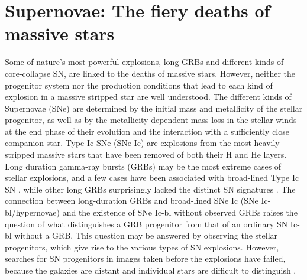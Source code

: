 \section{Supernovae: The fiery deaths of massive stars}
\label{sec:intro:sn}

Some of nature's most powerful explosions, long
  GRBs and different kinds of core-collapse SN, are linked to the
  deaths of massive stars. However, neither the progenitor system nor
  the production conditions that lead to each kind of explosion in a
  massive stripped star are well understood. The different kinds of
  Supernovae (SNe) are determined by the initial mass and metallicity
  of the stellar progenitor, as well as by the metallicity-dependent
  mass loss in the stellar winds at the end phase of their evolution
  and the interaction with a sufficiently close companion star. Type
  Ic SNe (SNe Ic) are explosions from the most heavily stripped
  massive stars that have been removed of both their H and He
  layers. Long duration gamma-ray bursts (GRBs) may be the most
  extreme cases of stellar explosions, and a few cases have been
  associated with broad-lined Type Ic SN \citep{Woosley2006}, while other long GRBs
  surprisingly lacked the distinct SN signatures \citep{Fynbo2006}. The connection
  between long-duration GRBs and broad-lined SNe Ic (SNe
  Ic-bl/hypernovae) and the existence of SNe Ic-bl without observed
  GRBs raises the question of what distinguishes a GRB progenitor from
  that of an ordinary SN Ic-bl without a GRB. This question may be
  answered by observing the stellar progenitors, which give rise to
  the various types of SN explosions. However, searches for SN
  progenitors in images taken before the explosions have failed,
  because the galaxies are distant and individual stars are difficult
  to distinguish \citep{Maund2005}.

